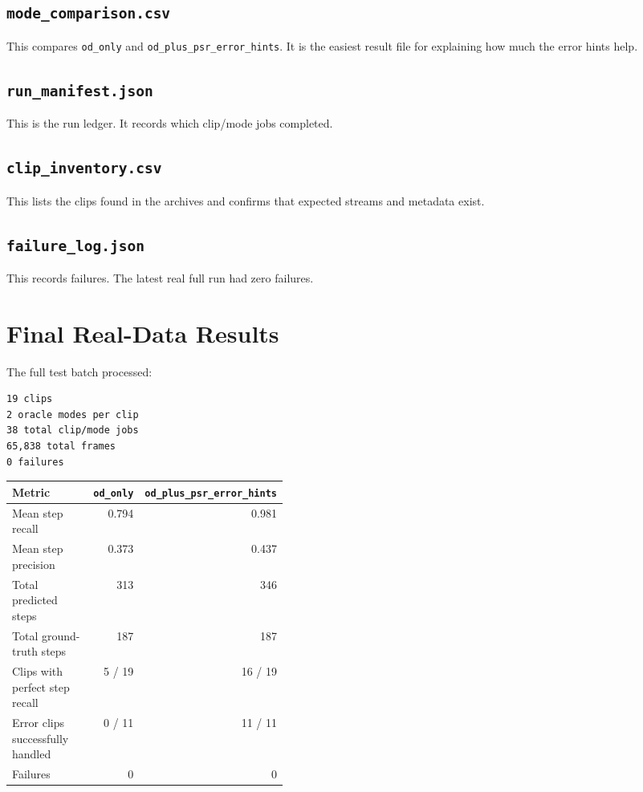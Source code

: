 \documentclass[11pt,a4paper]{article}
\begin{document}
\subsection{\texttt{mode\_comparison.csv}}

This compares \texttt{od\_only} and \texttt{od\_plus\_psr\_error\_hints}. It is the easiest result file for explaining how much the error hints help.

\subsection{\texttt{run\_manifest.json}}

This is the run ledger. It records which clip/mode jobs completed.

\subsection{\texttt{clip\_inventory.csv}}

This lists the clips found in the archives and confirms that expected streams and metadata exist.

\subsection{\texttt{failure\_log.json}}

This records failures. The latest real full run had zero failures.

\section{Final Real-Data Results}

The full test batch processed:

\begin{lstlisting}
19 clips
2 oracle modes per clip
38 total clip/mode jobs
65,838 total frames
0 failures
\end{lstlisting}

\begin{longtable}{p{0.40\linewidth} r r}
\toprule
\textbf{Metric} & \textbf{\texttt{od\_only}} & \textbf{\texttt{od\_plus\_psr\_error\_hints}} \\
\midrule
\endhead
Mean step recall & 0.794 & 0.981 \\
Mean step precision & 0.373 & 0.437 \\
Total predicted steps & 313 & 346 \\
Total ground-truth steps & 187 & 187 \\
Clips with perfect step recall & 5 / 19 & 16 / 19 \\
Error clips successfully handled & 0 / 11 & 11 / 11 \\
Failures & 0 & 0 \\
\bottomrule
\end{longtable}
\end{document}
